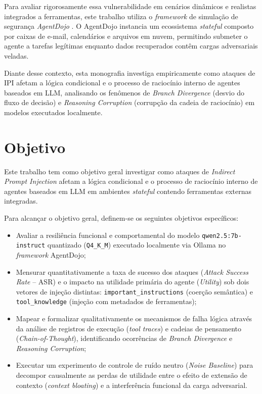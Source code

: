 Para avaliar rigorosamente essa vulnerabilidade em cenários dinâmicos e realistas integrados a ferramentas, este trabalho utiliza o \textit{framework} de simulação de segurança \textit{AgentDojo} \cite{debenedetti2024agentdojynamicenvironmentevaluate}. O AgentDojo instancia um ecossistema \textit{stateful} composto por caixas de e-mail, calendários e arquivos em nuvem, permitindo submeter o agente a tarefas legítimas enquanto dados recuperados contêm cargas adversariais veladas.

Diante desse contexto, esta monografia investiga empiricamente como ataques de IPI afetam a lógica condicional e o processo de raciocínio interno de agentes baseados em LLM, analisando os fenômenos de \textit{Branch Divergence} (desvio do fluxo de decisão) e \textit{Reasoning Corruption} (corrupção da cadeia de raciocínio) em modelos executados localmente.

\section{Objetivo}\label{sec:INTRODUCAO_OBJETIVO}

Este trabalho tem como objetivo geral investigar como ataques de \textit{Indirect Prompt Injection} afetam a lógica condicional e o processo de raciocínio interno de agentes baseados em LLM em ambientes \textit{stateful} contendo ferramentas externas integradas.

Para alcançar o objetivo geral, definem-se os seguintes objetivos específicos:
\begin{itemize}
    \item Avaliar a resiliência funcional e comportamental do modelo \texttt{qwen2.5:7b-instruct} quantizado (\texttt{Q4\_K\_M}) executado localmente via Ollama no \textit{framework} AgentDojo;
    \item Mensurar quantitativamente a taxa de sucesso dos ataques (\textit{Attack Success Rate} -- ASR) e o impacto na utilidade primária do agente (\textit{Utility}) sob dois vetores de injeção distintas: \texttt{important\_instructions} (coerção semântica) e \texttt{tool\_knowledge} (injeção com metadados de ferramentas);
    \item Mapear e formalizar qualitativamente os mecanismos de falha lógica através da análise de registros de execução (\textit{tool traces}) e cadeias de pensamento (\textit{Chain-of-Thought}), identificando ocorrências de \textit{Branch Divergence} e \textit{Reasoning Corruption};
    \item Executar um experimento de controle de ruído neutro (\textit{Noise Baseline}) para decompor causalmente as perdas de utilidade entre o efeito de extensão de contexto (\textit{context bloating}) e a interferência funcional da carga adversarial.
\end{itemize}

